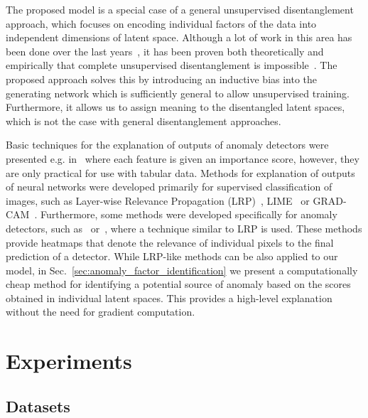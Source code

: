 The proposed model is a special case of a general unsupervised disentanglement approach, which focuses on encoding individual factors of the data into independent dimensions of latent space. Although a lot of work in this area has been done over the last years~\cite{burgess2018understanding, kim2018disentangling, esmaeili2019structuredhfvae, tschannen2018recent, bai2021contrastively, kim2019bayes}, it has been proven both theoretically and empirically that complete unsupervised disentanglement is impossible~\cite{locatello2019challenging, khemakhem2020variational, gabbay2021image}. The proposed approach solves this by introducing an inductive bias into the generating network which is sufficiently general to allow unsupervised training. Furthermore, it allows us to assign meaning to the disentangled latent spaces, which is not the case with general disentanglement approaches.

Basic techniques for the explanation of outputs of anomaly detectors were presented e.g. in~\cite{micenkova2013explaining, siddiqui2019sequential, kopp2020anomaly} where each feature is given an importance score, however, they are only practical for use with tabular data. Methods for explanation of outputs of neural networks were developed primarily for supervised classification of images, such as Layer-wise Relevance Propagation (LRP)~\cite{bach2015pixel}, LIME~\cite{ribeiro2016should} or GRAD-CAM~\cite{selvaraju2017grad}. Furthermore, some methods were developed specifically for anomaly detectors, such as~\cite{liznerski2020explainable} or~\cite{kauffmann2020towards}, where a technique similar to LRP is used. These methods provide heatmaps that denote the relevance of individual pixels to the final prediction of a detector. While LRP-like methods can be also applied to our model, in Sec.~\ref{sec:anomaly_factor_identification} we present a computationally cheap method for identifying a potential source of anomaly based on the scores obtained in individual latent spaces. This provides a high-level explanation without the need for gradient computation.


\section{Experiments} \label{sec:experiments}

\subsection{Datasets} \label{sec:datasets}


